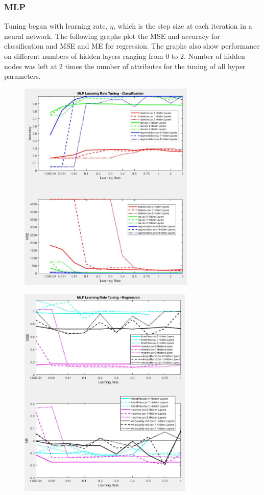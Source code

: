 \documentclass[twoside,11pt]{article}
\begin{document}
\subsubsection{MLP}
Tuning began with learning rate, $\eta$, which is the step size at each iteration in a neural network. The following graphs plot the MSE and accuracy for classification and MSE and ME for regression. The graphs also show performance on different numbers of hidden layers ranging from 0 to 2. Number of hidden nodes was left at 2 times the number of attributes for the tuning of all hyper parameters.
\begin{figure}[h]
	\centering
	\includegraphics[height=4in]{FINAL_FIGS/MLP_LR_TUNING_CLASS.JPG}
\end{figure}
\begin{figure}[h]
	\centering
	\includegraphics[height=4in]{FINAL_FIGS/MLP_LR_TUNING_REG.JPG}
\end{figure}
\end{document}
